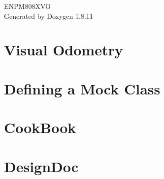 \documentclass[twoside]{book}
\newcommand{\+}{\discretionary{\mbox{\scriptsize$\hookleftarrow$}}{}{}}
\newcommand{\clearemptydoublepage}{%
  \newpage{\pagestyle{empty}\cleardoublepage}%
}
\begin{document}
\hypersetup{pageanchor=false,
             bookmarksnumbered=true,
             pdfencoding=unicode
            }
\begin{titlepage}
\vspace*{7cm}
\begin{center}%
{\Large E\+N\+P\+M808\+X\+VO }\\
\vspace*{1cm}
{\large Generated by Doxygen 1.8.11}\\
\end{center}
\end{titlepage}
\clearemptydoublepage
\tableofcontents
\clearemptydoublepage
{}
\hypersetup{pageanchor=true}

\chapter{Visual Odometry}
\label{md__home_bhargavi_Documents_SDR_Copy_Exam_808X_readme}
\hypertarget{md__home_bhargavi_Documents_SDR_Copy_Exam_808X_readme}{}

\chapter{Defining a Mock Class}
\label{md__home_bhargavi_Documents_SDR_Copy_Exam_808X_vendor_googletest_googlemock_docs_CheatSheet}
\hypertarget{md__home_bhargavi_Documents_SDR_Copy_Exam_808X_vendor_googletest_googlemock_docs_CheatSheet}{}

\chapter{Cook\+Book}
\label{md__home_bhargavi_Documents_SDR_Copy_Exam_808X_vendor_googletest_googlemock_docs_CookBook}
\hypertarget{md__home_bhargavi_Documents_SDR_Copy_Exam_808X_vendor_googletest_googlemock_docs_CookBook}{}

\chapter{Design\+Doc}
\label{md__home_bhargavi_Documents_SDR_Copy_Exam_808X_vendor_googletest_googlemock_docs_DesignDoc}
\hypertarget{md__home_bhargavi_Documents_SDR_Copy_Exam_808X_vendor_googletest_googlemock_docs_DesignDoc}{}

\end{document}
